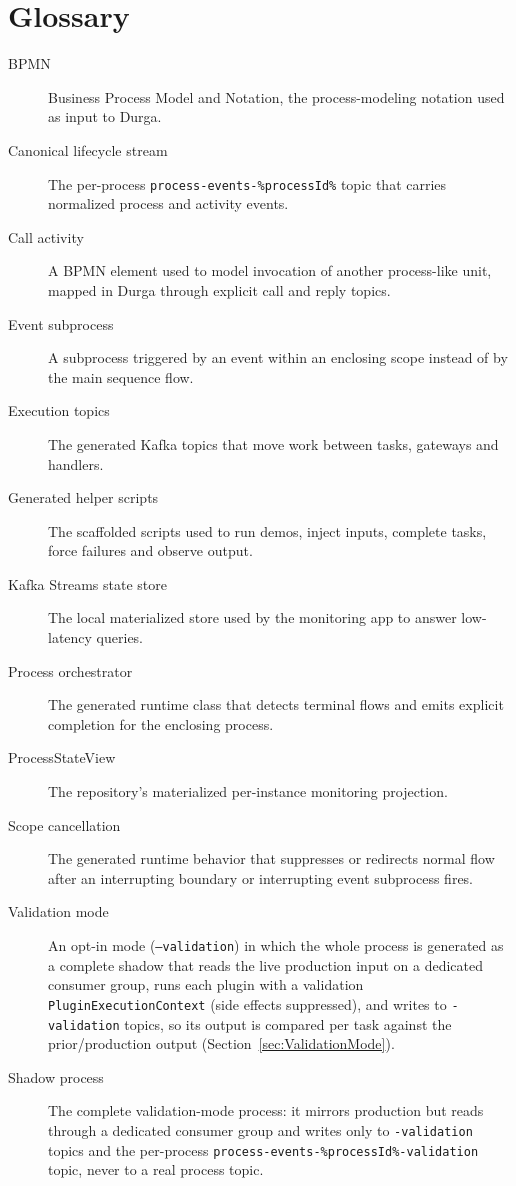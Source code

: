 \section{Glossary}
\label{sec:Glossary}

\begin{description}
\item[BPMN] Business Process Model and Notation, the process-modeling notation used as input to Durga.
\item[Canonical lifecycle stream] The per-process \texttt{process-events-\%processId\%} topic that carries normalized process and activity events.
\item[Call activity] A BPMN element used to model invocation of another process-like unit, mapped in Durga through explicit call and reply topics.
\item[Event subprocess] A subprocess triggered by an event within an enclosing scope instead of by the main sequence flow.
\item[Execution topics] The generated Kafka topics that move work between tasks, gateways and handlers.
\item[Generated helper scripts] The scaffolded scripts used to run demos, inject inputs, complete tasks, force failures and observe output.
\item[Kafka Streams state store] The local materialized store used by the monitoring app to answer low-latency queries.
\item[Process orchestrator] The generated runtime class that detects terminal flows and emits explicit completion for the enclosing process.
\item[ProcessStateView] The repository's materialized per-instance monitoring projection.
\item[Scope cancellation] The generated runtime behavior that suppresses or redirects normal flow after an interrupting boundary or interrupting event subprocess fires.
\item[Validation mode] An opt-in mode (\texttt{--validation}) in which the whole process is generated as a complete shadow that reads the live production input on a dedicated consumer group, runs each plugin with a validation \texttt{PluginExecutionContext} (side effects suppressed), and writes to \texttt{-validation} topics, so its output is compared per task against the prior/production output (Section~\ref{sec:ValidationMode}).
\item[Shadow process] The complete validation-mode process: it mirrors production but reads through a dedicated consumer group and writes only to \texttt{-validation} topics and the per-process \texttt{process-events-\%processId\%-validation} topic, never to a real process topic.

\end{description}
